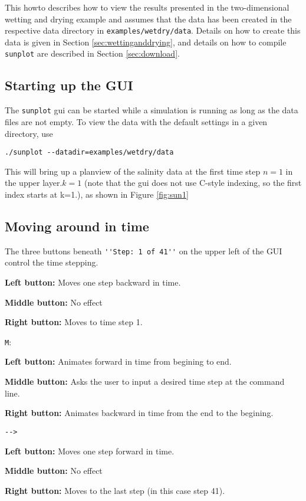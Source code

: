 \documentclass[12pt,oneside]{article}
\begin{document}
This howto describes how to view the results presented in the two-dimensional wetting
and drying example and assumes that the data has been created in the respective data directory
in \verb+examples/wetdry/data+.  Details on how to create this data is given in Section \ref{sec:wettinganddrying},
and details on how to compile \verb+sunplot+ are described in Section \ref{sec:download}.

\subsection{Starting up the GUI}

The \verb+sunplot+ gui can be started while a simulation is running as long as the data files
are not empty.  To view the data with the default settings in a given directory, use
\begin{verbatim}
./sunplot --datadir=examples/wetdry/data
\end{verbatim}
This will bring up a planview of the salinity data at the first time step $n=1$ in the upper layer.$k=1$ (note
that the gui does not use C-style indexing, so the first index starts at k=1.), as shown in Figure
\ref{fig:sun1}

\subsection{Moving around in time}

The three buttons beneath \verb+''Step: 1 of 41''+ on the upper left of the GUI control the time stepping.
\begin{list}{}
\item \button{$<--$}
\begin{list}{}
\item {\bf Left button:} Moves one step backward in time.
\item {\bf Middle button:} No effect
\item {\bf Right button:} Moves to time step 1.
\end{list}
\item \verb+M+: 
\begin{list}{}
\item {\bf Left button:} Animates forward in time from begining to end.
\item {\bf Middle button:} Asks the user to input a desired time step at the command line.
\item {\bf Right button:} Animates backward in time from the end to the begining.
\end{list}
\item \verb+-->+
\begin{list}{}
\item {\bf Left button:} Moves one step forward in time.
\item {\bf Middle button:} No effect
\item {\bf Right button:} Moves to the last step (in this case step 41).
\end{list}
\end{list}
\end{document}
